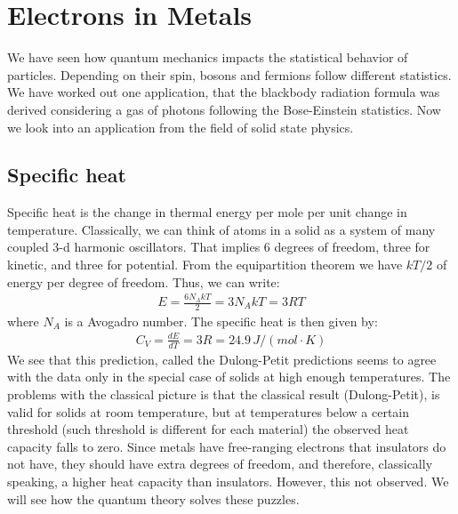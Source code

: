 \documentclass[11pt]{article}
\theoremstyle{break}
\theoremstyle{break}
\begin{document}
\section{Electrons in Metals}
We have seen how quantum mechanics impacts the statistical behavior of particles. Depending on their spin, bosons and fermions follow different statistics. We have worked out one application, that the blackbody radiation formula was derived considering a gas of photons following the Bose-Einstein statistics. Now we look into an application from the field of solid state physics. \\

\subsection{Specific heat}
Specific heat is the change in thermal energy per mole per unit change in temperature. Classically, we can think of atoms in a solid as a system of many coupled 3-d harmonic oscillators. That implies 6 degrees of freedom, three for kinetic, and three for potential. From the equipartition theorem we have $kT/2$ of energy per degree of freedom. Thus, we can write:
\begin{align*}
E = \frac{6N_AkT}{2} = 3N_AkT = 3RT
\end{align*}
where $N_A$ is a Avogadro number. The specific heat is then given by:
\begin{align*}
C_V = \frac{dE}{dT} = 3R = 24.9\, J/(mol\cdot K)
\end{align*}
We see that this prediction, called the Dulong-Petit predictions seems to agree with the data only in the special case of solids at high enough temperatures. The problems with the classical picture is that the classical result (Dulong-Petit), is valid for solids at room temperature, but at temperatures below a certain threshold (such threshold is different for each material) the observed heat capacity falls to zero. Since metals have free-ranging electrons that insulators do not have, they should have extra degrees of freedom, and therefore, classically speaking, a higher heat capacity than insulators. However, this not observed. We will see how the quantum theory solves these puzzles.\\
\end{document}
